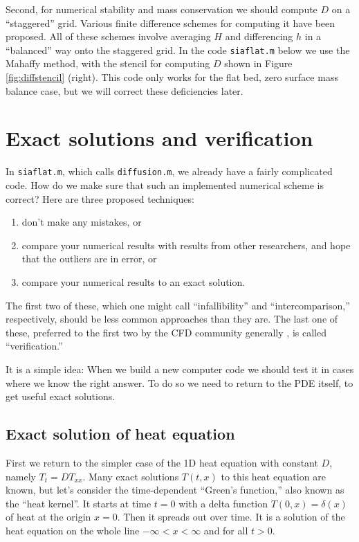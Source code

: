 \documentclass[letterpaper,final,12pt,reqno]{amsart}
\newcommand{\minput}[1]{
\vspace{0.8cm}
\VerbatimInput[frame=single,framesep=3mm,label=\fbox{\normalsize \textsl{\,#1.m\,}},fontfamily=courier,fontsize=\footnotesize]{tmp/#1.slim.m}
\vspace{0.5cm}
}
\begin{document}
Second, for numerical stability and mass conservation we should compute $D$ on a ``staggered'' grid.  Various finite difference schemes for computing it have been proposed.  All of these schemes involve averaging $H$ and differencing $h$ in a ``balanced'' way onto the staggered grid.  In the code \texttt{siaflat.m} below we use the Mahaffy \cite{Mahaffy} method, with the stencil for computing $D$ shown in Figure \ref{fig:diffstencil} (right).  This code only works for the flat bed, zero surface mass balance case, but we will correct these deficiencies later.

\minput{siaflat}


\section{Exact solutions and verification} \label{sec:exactsolutions}

In \texttt{siaflat.m}, which calls \texttt{diffusion.m}, we already have a fairly complicated code.  How do we make sure that such an implemented numerical scheme is correct?  Here are three proposed techniques:
\begin{enumerate}
  \item don't make any mistakes, or
  \item compare your numerical results with results from other researchers, and hope that the outliers are in error, or
  \item compare your numerical results to an exact solution.   \end{enumerate}
The first two of these, which one might call ``infallibility'' and ``intercomparison,'' respectively, should be less common approaches than they are.  The last one of these, preferred to the first two by the CFD community generally \cite{Wesseling}, is called ``verification.''

It is a simple idea:  When we build a new computer code we should test it in cases where we know the right answer.  To do so we need to return to the PDE itself, to get useful exact solutions.

\subsection*{Exact solution of heat equation}  First we return to the simpler case of the 1D heat equation with constant $D$, namely $T_t = D T_{xx}$.  Many exact solutions $T(t,x)$ to this heat equation are known, but let's consider the time-dependent ``Green's function,'' also known as the ``heat kernel''.  It starts at time $t=0$ with a delta function $T(0,x)=\delta(x)$ of heat at the origin $x=0$.  Then it spreads out over time.  It is a solution of the heat equation on the whole line $-\infty<x<\infty$ and for all $t>0$.
\end{document}
